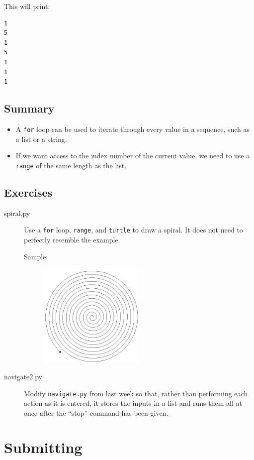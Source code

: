 \documentclass[11pt]{cselabheader}
\begin{document}
This will print:
\begin{lstlisting}[style=bash]
1
5
1
5
1
1
1
\end{lstlisting}

\subsection{Summary}
\begin{itemize}
  \item A \lstinline{for} loop can be used to iterate through every value in a
    sequence, such as a list or a string.
  \item If we want access to the index number of the current value, we need to
    use a \lstinline{range} of the same length as the list.
\end{itemize}

\subsection{Exercises}
\label{subsec:forex}

\begin{description}
  \item[spiral.py] Use a \lstinline{for} loop, \lstinline{range}, and
    \lstinline{turtle} to draw a spiral. It does not need to perfectly resemble
    the example.

    Sample:
    \begin{figure}[h]
      \centering
      \includegraphics[width=2.0in]{img/spiral}
    \end{figure}

  \item[navigate2.py] Modify \texttt{navigate.py} from last week so that,
    rather than performing each action as it is entered, it stores the inputs in a
    list and runs them all at once after the ``stop'' command has been given.
\end{description}

\pagebreak
\section{Submitting}
\end{document}
